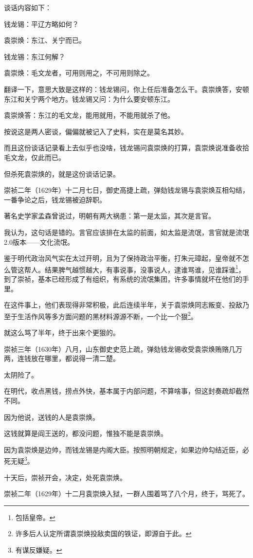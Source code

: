 \begin{multicols}{\theparacolNo}
谈话内容如下：

钱龙锡：平辽方略如何？

袁崇焕：东江、关宁而已。

钱龙锡：东江何解？

袁崇焕：毛文龙者，可用则用之，不可用则除之。

翻译一下，意思大致是这样的：钱龙锡问，你上任后准备怎么干。袁崇焕答，安顿东江和关宁两个地方。钱龙锡又问：为什么要安顿东江。

袁崇焕答：东江的毛文龙，能用就用，不能用就杀了他。

按说这是两人密谈，偏偏就被记入了史料，实在是莫名其妙。

而且这份谈话记录看上去似乎也没啥，钱龙锡问袁崇焕的打算，袁崇焕说准备收拾毛文龙，仅此而已。

但杀死袁崇焕的，就是这份谈话记录。

崇祯二年（1629年）十二月七日，御史高捷上疏，弹劾钱龙锡与袁崇焕互相勾结，一番争论之后，钱龙锡被迫辞职。

著名史学家孟森曾说过，明朝有两大祸患：第一是太监，其次是言官。

我认为，这句话是错的。言官应该排在太监的前面，如太监是流氓，言官就是流氓2.0版本——文化流氓。

鉴于明代政治风气实在太过开明，且为了保持政治平衡，打朱元璋起，皇帝就不怎么管这帮人。结果脾气越惯越大，有事说事，没事说人，逮谁骂谁，见谁踩谁\footnote{包括皇帝。}，到了崇祯，基本已经形成了有组织，有系统的流氓集团，许多事情就坏在他们的手里。

在这件事上，他们表现得非常积极，此后连续半年，关于袁崇焕同志叛变、投敌乃至于生活作风等多方面问题的黑材料源源不断，一个比一个狠\footnote{许多后人认定所谓袁崇焕投敌卖国的铁证，即源自于此。}。

就这么骂了半年，终于出来个更狠的。

崇祯三年（1630年）八月，山东御史史范上疏，弹劾钱龙锡收受袁崇焕贿赂几万两，连钱放在哪里，都说得一清二楚。

太阴险了。

在明代，收点黑钱，捞点外快，基本属于内部问题，不算啥事，但这封奏疏却截然不同。

因为他说，送钱的人是袁崇焕。

这钱就算是阎王送的，都没问题，惟独不能是袁崇焕。

因为袁崇焕是边帅，而钱龙锡是内阁大臣。按照明朝规定，如果边帅勾结近臣，必死无疑\footnote{有谋反嫌疑。}。

十天后，崇祯开会，决定，处死袁崇焕。

崇祯二年（1629年）十二月袁崇焕入狱，一群人围着骂了八个月，终于，骂死了。


\end{multicols}
